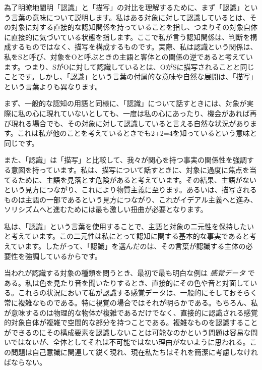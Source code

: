 \documentclass[a4paper,11pt,openany]{ltjsbook}
\begin{document}
為了明瞭地闡明「認識」と「描写」の対比を理解するために、まず「認識」という言葉の意味について説明します。私はある対象に対して認識しているとは、その対象に対する直接的な認知関係を持っていることを指し、つまりその対象自体に直接的に気づいている状態を指します。ここで私が言う認知関係は、判断を構成するものではなく、描写を構成するものです。実際、私は認識という関係は、私をSと呼び、対象をOと呼ぶときの主語と客体との関係の逆であると考えています。つまり、SがOに対して認識しているとは、OがSに描写されることと同じことです。しかし、「認識」という言葉の付属的な意味や自然な展開は、「描写」という言葉よりも異なります。

まず、一般的な認知の用語と同様に、「認識」について話すときには、対象が実際に私の心に現れていないとしても、一度は私の心にあったり、機会があれば再び現れる場合でも、その対象に対して認識していると言える自然な状況があります。これは私が他のことを考えているときでも2+2=4を知っているという意味と同じです。

また、「認識」は「描写」と比較して、我々が関心を持つ事実の関係性を強調する意図を持っています。私は、描写について話すときに、対象に過度に焦点を当てるために、主語を見落とす危険があると考えています。その結果、主語がないという見方につながり、これにより物質主義に至ります。あるいは、描写されるものは主語の一部であるという見方につながり、これがイデアル主義へと進み、ソリシズムへと進むためには最も激しい扭曲が必要となります。

私は、「認識」という言葉を使用することで、主語と対象の二元性を保持したいと考えています。この二元性は私にとって認知に関する基本的な事実であると考えています。したがって、「認識」を選んだのは、その言葉が認識する主体の必要性を強調しているからです。

当われが認識する対象の種類を問うとき、最初で最も明白な例は \textit{感覚データ} である。私は色を見たり音を聞いたりするとき、直接的にその色や音と対面している。これらの状況において私が認識する感覚データは、一般的にそしておそらく常に複雑なものである。特に視覚の場合ではそれが明らかである。もちろん、私が意味するのは物理的な物体が複雑であるだけでなく、直接的に認識される感覚的対象自体が複雑で空間的な部分を持つことである。複雑なものを認識することができるのにその構成要素を認識しないことは可能なのかという問題は容易な問いではないが、全体としてそれは不可能ではない理由がないように思われる。この問題は自己意識に関連して鋭く現れ、現在私たちはそれを簡潔に考慮しなければならない。
\end{document}
